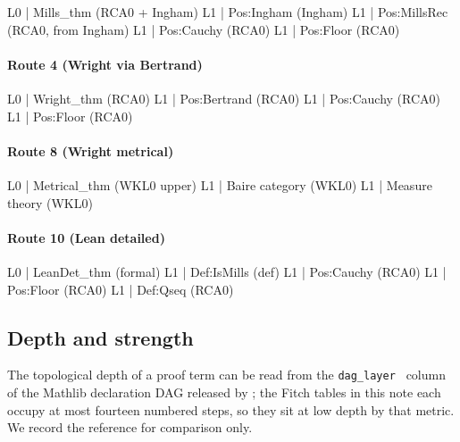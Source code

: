 \documentclass[11pt,reqno]{amsart}
\theoremstyle{redplain}
\numberwithin{equation}{section}
\begin{document}
\begin{verbatimbox}
L0 | Mills_thm                          (RCA0 + Ingham)
L1 |   Pos:Ingham                       (Ingham)
L1 |   Pos:MillsRec                     (RCA0, from Ingham)
L1 |   Pos:Cauchy                       (RCA0)
L1 |   Pos:Floor                        (RCA0)
\end{verbatimbox}

\paragraph{Route 4 (Wright via Bertrand)}

\begin{verbatimbox}
L0 | Wright_thm                         (RCA0)
L1 |   Pos:Bertrand                     (RCA0)
L1 |   Pos:Cauchy                       (RCA0)
L1 |   Pos:Floor                        (RCA0)
\end{verbatimbox}

\paragraph{Route 8 (Wright metrical)}

\begin{verbatimbox}
L0 | Metrical_thm                       (WKL0 upper)
L1 |   Baire category                   (WKL0)
L1 |   Measure theory                   (WKL0)
\end{verbatimbox}

\paragraph{Route 10 (Lean detailed)}

\begin{verbatimbox}
L0 | LeanDet_thm                        (formal)
L1 |   Def:IsMills                      (def)
L1 |   Pos:Cauchy                       (RCA0)
L1 |   Pos:Floor                        (RCA0)
L1 |   Def:Qseq                         (RCA0)
\end{verbatimbox}

\subsection{Depth and strength}

The topological depth of a proof term can be read from the \texttt{dag\_layer%
} column of the Mathlib declaration DAG released by \cite{MathlibGraph}; the
Fitch tables in this note each occupy at most fourteen numbered steps, so
they sit at low depth by that metric. We record the reference for comparison
only.
\end{document}
